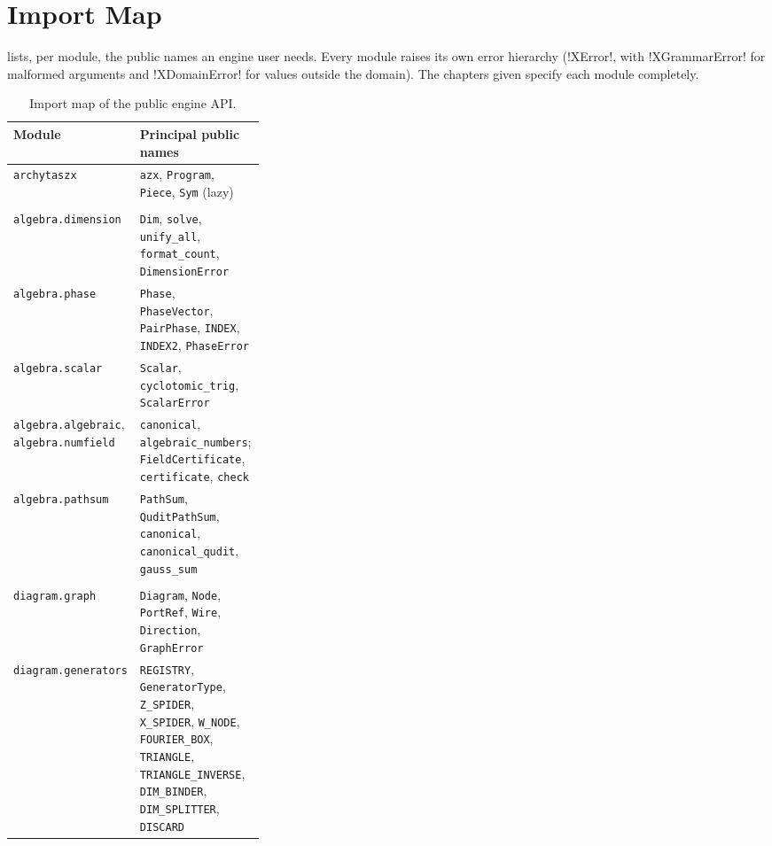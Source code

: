 \section{Import Map}\label{sec:python-api-map}

 lists, per module, the public names an engine user needs. Every module raises its own error hierarchy (\code!XError!, with \code!XGrammarError! for malformed arguments and \code!XDomainError! for values outside the domain). The chapters given specify each module completely.

\begin{xltabular}{\linewidth}{@{}>{\raggedright\arraybackslash}p{0.33\linewidth}X@{}}
\toprule
Module & Principal public names \\
\midrule
\endhead
\bottomrule
\caption{Import map of the public engine API.}\label{tab:python-api-map}
\endlastfoot
\texttt{archytaszx} & \texttt{azx}, \texttt{Program}, \texttt{Piece}, \texttt{Sym} (lazy) \\
 \\
\texttt{algebra.dimension} & \texttt{Dim}, \texttt{solve}, \texttt{unify\_all}, \texttt{format\_count}, \texttt{DimensionError} \\
\texttt{algebra.phase} & \texttt{Phase}, \texttt{PhaseVector}, \texttt{PairPhase}, \texttt{INDEX}, \texttt{INDEX2}, \texttt{PhaseError} \\
\texttt{algebra.scalar} & \texttt{Scalar}, \texttt{cyclotomic\_trig}, \texttt{ScalarError} \\
\texttt{algebra.algebraic}, \texttt{algebra.numfield} & \texttt{canonical}, \texttt{algebraic\_numbers}; \texttt{FieldCertificate}, \texttt{certificate}, \texttt{check} \\
\texttt{algebra.pathsum} & \texttt{PathSum}, \texttt{QuditPathSum}, \texttt{canonical}, \texttt{canonical\_qudit}, \texttt{gauss\_sum} \\
 \\
\texttt{diagram.graph} & \texttt{Diagram}, \texttt{Node}, \texttt{PortRef}, \texttt{Wire}, \texttt{Direction}, \texttt{GraphError} \\
\texttt{diagram.generators} & \texttt{REGISTRY}, \texttt{GeneratorType}, \texttt{Z\_SPIDER}, \texttt{X\_SPIDER}, \texttt{W\_NODE}, \texttt{FOURIER\_BOX}, \texttt{TRIANGLE}, \texttt{TRIANGLE\_INVERSE}, \texttt{DIM\_BINDER}, \texttt{DIM\_SPLITTER}, \texttt{DISCARD} \\

\end{xltabular}
